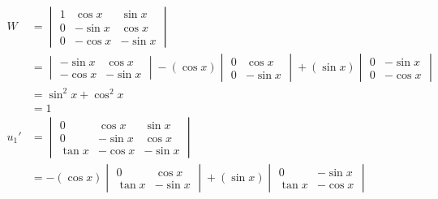 \documentclass{article}
\begin{document}
\begin{align*}
  W    & = \begin{vmatrix}
             1 & \cos x  & \sin x  \\
             0 & -\sin x & \cos x  \\
             0 & -\cos x & -\sin x
           \end{vmatrix}                                            \\
       & = \begin{vmatrix}
             -\sin x & \cos x  \\
             -\cos x & -\sin x
           \end{vmatrix} - (\cos x) \begin{vmatrix}
                                      0 & \cos x  \\
                                      0 & -\sin x
                                    \end{vmatrix} + (\sin x) \begin{vmatrix}
                                                               0 & -\sin x \\
                                                               0 & -\cos x
                                                             \end{vmatrix} \\
       & = \sin^2 x + \cos^2 x                                              \\
       & = 1                                                                \\
  u_1' & = \begin{vmatrix}
             0      & \cos x  & \sin x  \\
             0      & -\sin x & \cos x  \\
             \tan x & -\cos x & -\sin x
           \end{vmatrix}                                       \\
       & = -(\cos x) \begin{vmatrix}
                       0      & \cos x  \\
                       \tan x & -\sin x
                     \end{vmatrix} + (\sin x) \begin{vmatrix}
                                                0      & -\sin x \\
                                                \tan x & -\cos x
                                              \end{vmatrix}              \\

\end{align*}
\end{document}
